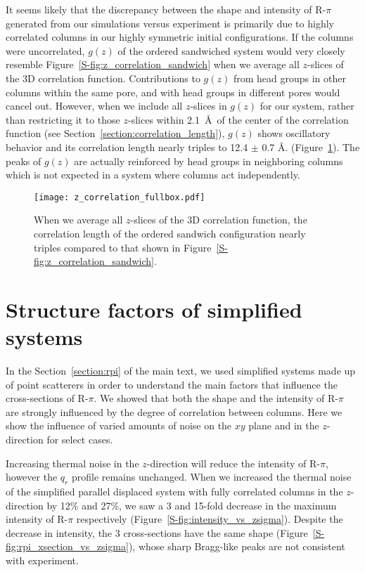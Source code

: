   It seems likely that the discrepancy between the shape and intensity of
  R-$\pi$ generated from our simulations versus experiment is primarily due to
  highly correlated columns in our highly symmetric initial configurations.
  If the columns were uncorrelated, $g(z)$ of the ordered sandwiched system 
  would very closely resemble Figure~\ref{S-fig:z_correlation_sandwich} when we 
  average all $z$-slices of the 3D correlation function. Contributions to
  $g(z)$ from head groups in other columns within the same pore, and with head
  groups in different pores would cancel out. However, when we include all 
  $z$-slices in $g(z)$ for our system, rather than restricting it to those 
  $z$-slices within 2.1~\AA~of the center of the correlation function 
  (see Section~\ref{section:correlation_length}), $g(z)$ shows oscillatory 
  behavior and its correlation length nearly triples to 12.4 $\pm$ 0.7 \AA.
  (Figure~\ref{S-fig:z_correlation_fullbox}). The peaks of $g(z)$ are actually 
  reinforced by head groups in neighboring columns which is not expected
  in a system where columns act independently.

  \begin{figure}
  \centering
  \texttt{[image: z\_correlation\_fullbox.pdf]}
  \caption{When we average all $z$-slices of the 3D correlation function, the 
  correlation length of the ordered sandwich configuration nearly triples compared 
  to that shown in Figure~\ref{S-fig:z_correlation_sandwich}.}\label{S-fig:z_correlation_fullbox}
  \end{figure}
  
  \section{Structure factors of simplified systems}\label{S-section:simplified_sf} 
  
  In the Section~\ref{section:rpi} of the main text, we used simplified systems
  made up of point scatterers in order to understand the main factors that influence
  the cross-sections of R-$\pi$. We showed that both the shape and the intensity
  of R-$\pi$ are strongly influenced by the degree of correlation between columns.
  Here we show the influence of varied amounts of noise on the $xy$ plane and in
  the $z$-direction for select cases.
  
  Increasing thermal noise in the $z$-direction will reduce the intensity
  of R-$\pi$, however the $q_r$ profile remains unchanged. When we increased the
  thermal noise of the simplified parallel displaced system with fully correlated
  columns in the $z$-direction by 12\% and 27\%, we saw a 3 and 15-fold decrease in
  the maximum intensity of R-$\pi$ respectively (Figure~\ref{S-fig:intensity_vs_zsigma}).
  Despite the decrease in intensity, the 3 cross-sections have the same shape 
  (Figure~\ref{S-fig:rpi_xsection_vs_zsigma}), whose sharp Bragg-like peaks are
  not consistent with experiment. 
  
